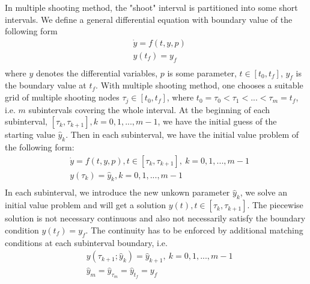 	In multiple shooting method, the "shoot" interval is partitioned into some short intervals. We define a general differential equation with boundary value of the following form
	\begin{equation}\label{eqn:ori_dae}
		\begin{aligned}
			& \dot{y} = f(t, y, p) \\ 
			& y(t_f) = y_f  \\
		\end{aligned}
	\end{equation}
	where $y$ denotes the differential variables, $p$ is some parameter, $t \in [t_0, t_f]$,  $y_f$ is the boundary value at $t_f$.  With multiple shooting method, one chooses a suitable grid of multiple shooting nodes $\tau_j \in [t_0,t_f] $, where $t_0 = \tau_0 < \tau_1 < ... < \tau_m = t_f$,  i.e. $m$ subintervals covering the whole interval. At the beginning of each subinterval, $[\tau_k, \tau_{k+1}], k = 0, 1, ..., m-1$, we have the initial guess of the starting value $\hat{y}_k$. Then in each subinterval, we have the initial value problem of the following form: 
	\begin{equation}\label{eqn:msh}
		\begin{aligned}
			& \dot{y} = f(t, y, p) , t \in [\tau_k, \tau_{k+1}], \ k = 0, 1, ..., m-1   \\ 
			& y(\tau_k) = \hat{y}_k, k = 0, 1, ..., m-1  \\
		\end{aligned}
	\end{equation}
	In each subinterval, we introduce the new unkown parameter $\hat{y}_k$, we solve an initial value problem and will get a solution $y(t), t \in [\tau_k, \tau_{k+1}]$. The piecewise solution is not necessary continuous and also not necessarily satisfy the boundary condition $y(t_f) = y_f$. The continuity has to be enforced by additional matching conditions at each subinterval boundary, i.e. 
	\begin{equation}\label{eqn:mc}
		\begin{aligned}
			& y(\tau_{k+1}; \hat{y}_k) = \hat{y}_{k+1}, \  k = 0, 1, ..., m-1  \\
			& \hat{y}_{m} = \hat{y}_{\tau_m} = \hat{y}_{t_f} =  y_f 
		\end{aligned}
	\end{equation}
	
